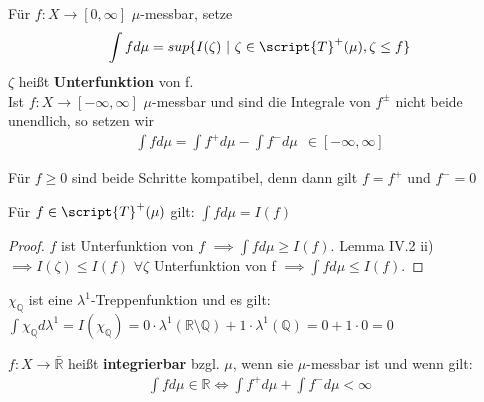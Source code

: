   \begin{definition}
    Für $f: X \to [0,\infty]$ $\mu$-messbar, setze
    \begin{align*}
      \int f d\mu = sup\{I(\zeta) \ | \ \zeta \in \script{T}^+(\mu), \zeta \leq f\}
    \end{align*}
    $\zeta$ heißt \textbf{Unterfunktion} von f.\\
    Ist $f: X \to [-\infty, \infty]$ $\mu$-messbar und sind die Integrale von $f^{\pm}$ nicht beide unendlich, so setzen wir
    \begin{align*}
      \int f d\mu = \int f^+ d\mu - \int f^- d\mu \ \ \in [-\infty, \infty] 
    \end{align*}
  \end{definition}

  \begin{remark}
    Für $f \geq 0$ sind beide Schritte kompatibel, denn dann gilt $f = f^+$ und $f^- = 0$
  \end{remark}

  \begin{lemma}
    Für $f \in \script{T}^+(\mu)$ gilt: $\int f d\mu = I(f)$
  \end{lemma}

  \begin{proof}
    $f$ ist Unterfunktion von $f$ $\implies \int f d\mu \geq I(f)$. \newline
    Lemma IV.2 ii) $\implies I(\zeta) \leq I(f)$ $\forall \zeta$ Unterfunktion von f $\implies \int f d\mu \leq I(f)$.
  \end{proof}

  \begin{example}
    $\chi_{\mathbb{Q}}$ ist eine $\lambda^1$-Treppenfunktion und es gilt:\\
    $\int \chi_{\mathbb{Q}} d\lambda^1 = I(\chi_{\mathbb{Q}}) = 0 \cdot \lambda^1(\mathbb{R} \setminus \mathbb{Q}) + 1 \cdot \lambda^1(\mathbb{Q}) = 0 + 1 \cdot 0 = 0$
  \end{example}

  \begin{definition}
    $f:X \to \bar{\mathbb{R}}$ heißt \textbf{integrierbar} bzgl. $\mu$, wenn sie $\mu$-messbar ist und wenn gilt:
    \begin{align*}
      \int f d\mu \in \mathbb{R} \Leftrightarrow \int f^+ d\mu + \int f^- d\mu < \infty
    \end{align*}
  \end{definition}

